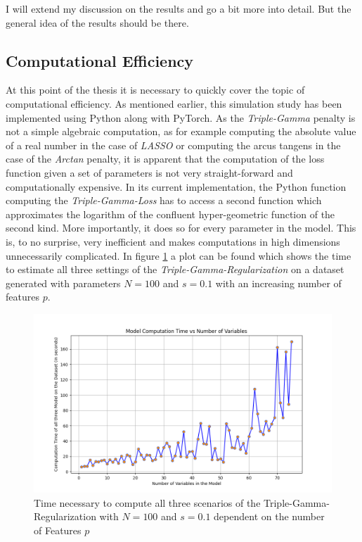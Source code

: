 \documentclass[12pt,a4paper]{article}
\newenvironment{lightbluebox}{%
    \begin{tcolorbox}[colback=lightblue, colframe=lightblue, fontupper=\itshape]%
}{%
    \end{tcolorbox}%
}
\begin{document}
\begin{lightbluebox}
I will extend my discussion on the results and go a bit more into detail. But the general idea of the results should be there.
\end{lightbluebox}

\newpage
\subsection{Computational Efficiency}
At this point of the thesis it is necessary to quickly cover the topic of computational efficiency. As mentioned earlier, this simulation study has been implemented using Python along with PyTorch. As the \textit{Triple-Gamma} penalty is not a simple algebraic computation, as for example computing the absolute value of a real number in the case of \textit{LASSO} or computing the arcus tangens in the case of the \textit{Arctan} penalty, it is apparent that the computation of the loss function given a set of parameters is not very straight-forward and computationally expensive. In its current implementation, the Python function computing the \textit{Triple-Gamma-Loss} has to access a second function which approximates the logarithm of the confluent hyper-geometric  function of the second kind. More importantly, it does so for every parameter in the model. This is, to no surprise, very inefficient and makes computations in high dimensions unnecessarily complicated. In figure \ref{fig:ComputationTime} a plot can be found which shows the time to estimate all three settings of the \textit{Triple-Gamma-Regularization} on a dataset generated with parameters $N=100$ and $s=0.1$ with an increasing number of features $p$.


\begin{figure}[h!]
\centering
\includegraphics[scale=0.55]{../02_simulation/021_simulation_figures/ComputationTime_Example.png}
\caption{Time necessary to compute all three scenarios of the Triple-Gamma-Regularization with $N=100$ and $s=0.1$ dependent on the number of Features $p$}
\label{fig:ComputationTime}
\end{figure} 	
\end{document}
